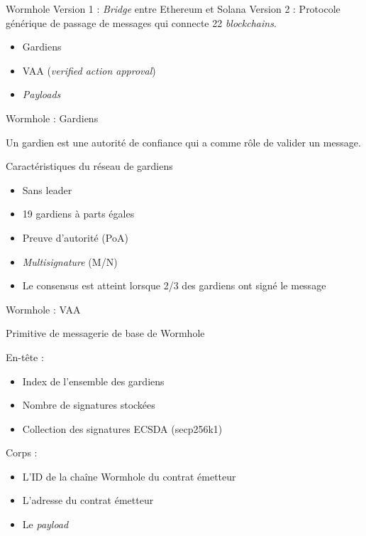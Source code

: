 \begin{frame}{Wormhole}
    Version 1 : \textit{Bridge} entre Ethereum et Solana
    \newline 
    \newline
    Version 2 : Protocole générique de passage de messages qui connecte 22 \textit{blockchains}.
    \newline
    
    \begin{itemize}
        \item Gardiens
        \item VAA (\textit{verified action approval})
        \item \textit{Payloads}
    \end{itemize}
\end{frame}
    
\begin{frame}{Wormhole : Gardiens}
    
    Un gardien est une autorité de confiance qui a comme rôle de valider un message.\newline
    
        \begin{block}{Caractéristiques du réseau de gardiens}
            \begin{itemize}
                \item Sans leader
                \item 19 gardiens à parts égales
                \item Preuve d'autorité (PoA)
                \item \textit{Multisignature} (M/N)
                \item Le consensus est atteint lorsque 2/3 des gardiens ont signé le message
            \end{itemize}
        \end{block}
\end{frame}
    
\begin{frame}{Wormhole : VAA}
    
    Primitive de messagerie de base de Wormhole
    \newline
    
    En-tête :
    \begin{itemize}
        \item Index de l'ensemble des gardiens
        \item Nombre de signatures stockées
        \item Collection des signatures ECSDA (secp256k1)
    \end{itemize}
    
    Corps : 
    \begin{itemize}
        \item L'ID de la chaîne Wormhole du contrat émetteur
        \item L'adresse du contrat émetteur
        \item Le \textit{payload}
    \end{itemize}
\end{frame}
    

